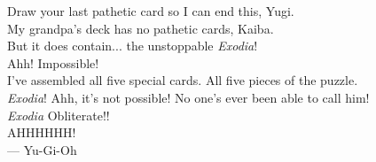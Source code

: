\thispagestyle{empty}
{}

\vspace*{3cm}

\begin{center}
    Draw your last pathetic card so I can end this, Yugi.\\\medskip
    My grandpa's deck has no pathetic cards, Kaiba. \\But it does contain...  the unstoppable \emph{Exodia}!\\\medskip
    Ahh!  Impossible!\\\medskip
    I've assembled all five special cards. All five pieces of the puzzle.\\\medskip
    \emph{Exodia}! Ahh, it's not possible! No one's ever been able to call him!\\\medskip
    \emph{Exodia} Obliterate!!\\\medskip
    AHHHHHH!\\
    \bigskip
    --- Yu-Gi-Oh    


\end{center}

\medskip